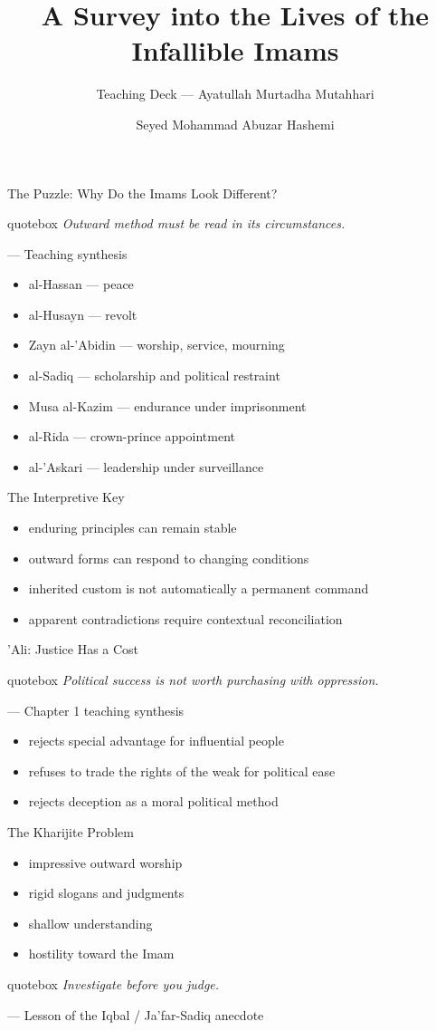 \documentclass[11pt,aspectratio=169]{beamer}
\title{A Survey into the Lives of the Infallible Imams}
\subtitle{Teaching Deck — Ayatullah Murtadha Mutahhari}
\author{Seyed Mohammad Abuzar Hashemi}
\newcommand{\bigquote}[2]{%
\begin{beamercolorbox}[wd=\linewidth,sep=6pt]{quotebox}
{\large\itshape\color{deepteal}#1}\par
{\footnotesize --- #2}
\end{beamercolorbox}}
\begin{document}
\begin{frame}[plain]\titlepage\end{frame}

\begin{frame}{The Puzzle: Why Do the Imams Look Different?}
\bigquote{Outward method must be read in its circumstances.}{Teaching synthesis}
\begin{itemize}
\item al-Hassan — peace
\item al-Husayn — revolt
\item Zayn al-'Abidin — worship, service, mourning
\item al-Sadiq — scholarship and political restraint
\item Musa al-Kazim — endurance under imprisonment
\item al-Rida — crown-prince appointment
\item al-'Askari — leadership under surveillance
\end{itemize}
\end{frame}

\begin{frame}{The Interpretive Key}
\begin{itemize}
\item enduring principles can remain stable
\item outward forms can respond to changing conditions
\item inherited custom is not automatically a permanent command
\item apparent contradictions require contextual reconciliation
\end{itemize}
\end{frame}

\begin{frame}{'Ali: Justice Has a Cost}
\bigquote{Political success is not worth purchasing with oppression.}{Chapter 1 teaching synthesis}
\begin{itemize}
\item rejects special advantage for influential people
\item refuses to trade the rights of the weak for political ease
\item rejects deception as a moral political method
\end{itemize}
\end{frame}

\begin{frame}{The Kharijite Problem}
\begin{itemize}
\item impressive outward worship
\item rigid slogans and judgments
\item shallow understanding
\item hostility toward the Imam
\end{itemize}
\bigquote{Investigate before you judge.}{Lesson of the Iqbal / Ja'far-Sadiq anecdote}
\end{frame}
\end{document}
